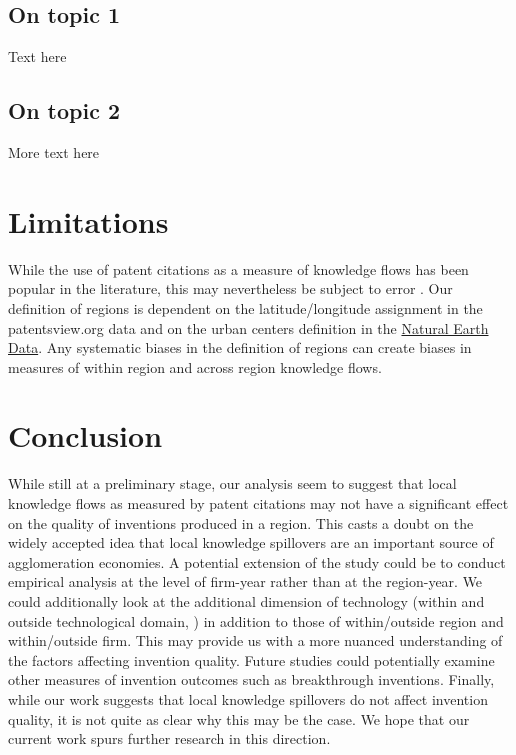 \documentclass[12pt,letterpaper]{article}
\begin{document}
\subsection{On topic 1}
Text here
\subsection{On topic 2}
More text here

\section*{Limitations}
While the use of patent citations as a measure of knowledge flows has been popular in the literature, this may nevertheless be subject to error \citep*{Arora2017a}. Our definition of regions is dependent on the latitude/longitude assignment in the patentsview.org data and on the urban centers definition in the \href{http://www.naturalearthdata.com/downloads/10m-cultural-vectors/}{Natural Earth Data}. Any systematic biases in the definition of regions can create biases in measures of within region and across region knowledge flows. \par

\section*{Conclusion}
While still at a preliminary stage, our analysis seem to suggest that local knowledge flows as measured by patent citations may not have a significant effect on the quality of inventions produced in a region. This casts a doubt on the widely accepted idea that local knowledge spillovers are an important source of agglomeration economies. A potential extension of the study could be to conduct empirical analysis at the level of firm-year rather than at the region-year. We could additionally look at the additional dimension of technology (within and outside technological domain, \cite{Rosenkopf2001}) in addition to those of within/outside region and within/outside firm. This may provide us with a more nuanced understanding of the factors affecting invention quality. Future studies could potentially examine other measures of invention outcomes such as breakthrough inventions. Finally, while our work suggests that local knowledge spillovers do not affect invention quality, it is not quite as clear why this may be the case. We hope that our current work spurs further research in this direction.  

\renewcommand{\refname}{REFERENCES}
 

\newpage

\newpage

\end{document}
